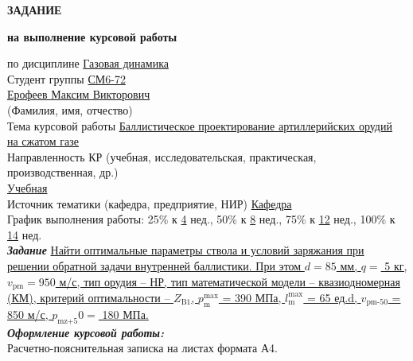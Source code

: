 \documentclass[14pt, a4paper]{report} %
\newcommand{\und}[1]{\uline{#1}}
\begin{document}
\begin{titlepage}
    \vspace{2cm}
    \textbf{ЗАДАНИЕ}

    \textbf{на выполнение курсовой работы}

    \vspace{1cm}
    \begin{flushleft}
        по дисциплине \und{Газовая динамика} \hfill \underline{\hspace{7cm}} \\[0.5cm]
        Студент группы \und{СМ6-72} \\[0.5cm]
        \underline{\hspace{12cm}} \und{Ерофеев Максим Викторович} \\
        \hspace{5cm} (Фамилия, имя, отчество) \\[0.5cm]
        Тема курсовой работы \und{Баллистическое проектирование артиллерийских орудий} \\
        \und{на сжатом газе} \\[0.5cm]
        Направленность КР (учебная, исследовательская, практическая, производственная, др.) \\
        \und{Учебная} \hfill \underline{\hspace{7cm}} \\[0.5cm]
        Источник тематики (кафедра, предприятие, НИР) \und{Кафедра} \hfill \underline{\hspace{5cm}} \\[0.5cm]
        График выполнения работы: 25\% к \und{4} нед., 50\% к \und{8} нед., 75\% к \und{12} нед., 100\% к \und{14} нед. \\[1cm]
        \textbf{\textit{Задание}} \und{Найти оптимальные параметры ствола и условий заряжания при решении обратной задачи внутренней баллистики. При этом $d = 85$ мм, $q =$ 5 кг, $ v_{\text{pm}} = 950 $ м/с, тип орудия – НР, тип математической модели – квазиодномерная (КМ), критерий оптимальности – $Z_{\text{B1}}$, $p^{\text{max}}_{\text{m}}$ = 390 МПа, $l^{\text{max}}_{\text{m}}$ = 65 ед.d, $v_{\text{pm-50}}$ = 850 м/с, $p_{\text{mz+5}}0 = $ 180 МПа.} \\[1cm]
        \textbf{\textit{Оформление курсовой работы:}} \\[0.5cm]
        Расчетно-пояснительная записка на \underline{\hspace{2cm}} листах формата А4. \\[0.5cm]
        \underline{\hspace{15cm}} \\

\end{flushleft}
\end{titlepage}
\end{document}

